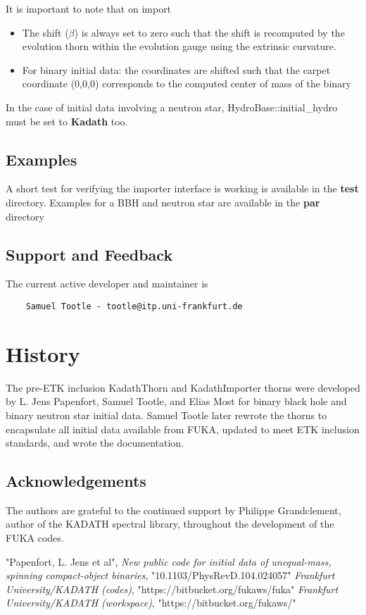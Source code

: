 It is important to note that on import
\begin{itemize}
    \item The shift ($\beta$) is always set to zero such that the shift is recomputed by the evolution thorn within the evolution gauge using the extrinsic curvature.
    \item For binary initial data: the coordinates are shifted such that the carpet coordinate (0,0,0) corresponds to the computed center of mass of the binary
\end{itemize}

In the case of initial data involving a neutron star, HydroBase::initial\_hydro must be set to \textbf{Kadath} too.
\subsection{Examples}
A short test for verifying the importer interface is working is available in the \textbf{test}
directory.  Examples for a BBH and neutron star are available in the \textbf{par} directory

\subsection{Support and Feedback}
The current active developer and maintainer is
\begin{verbatim}
    Samuel Tootle - tootle@itp.uni-frankfurt.de
\end{verbatim}

\section{History}
The pre-ETK inclusion KadathThorn and KadathImporter thorns were developed by L. Jens Papenfort, 
Samuel Tootle, and Elias Most for binary black hole and binary neutron star initial data. 
Samuel Tootle later rewrote the thorns to encapsulate all initial data available
from FUKA, updated to meet ETK inclusion standards, and wrote the documentation.

\subsection{Acknowledgements}
The authors are grateful to the continued support by Philippe Grandclement, author of
the KADATH spectral library, throughout the development of the FUKA codes.

\begin{thebibliography}{9}
    "Papenfort, L. Jens et al", \emph{New public code for initial data of unequal-mass, spinning compact-object binaries},
        "10.1103/PhysRevD.104.024057"
    \emph{Frankfurt University/KADATH (codes)}, "{https://bitbucket.org/fukaws/fuka}"
    \emph{Frankfurt University/KADATH (workspace)}, "{https://bitbucket.org/fukaws/}"

\end{thebibliography}



